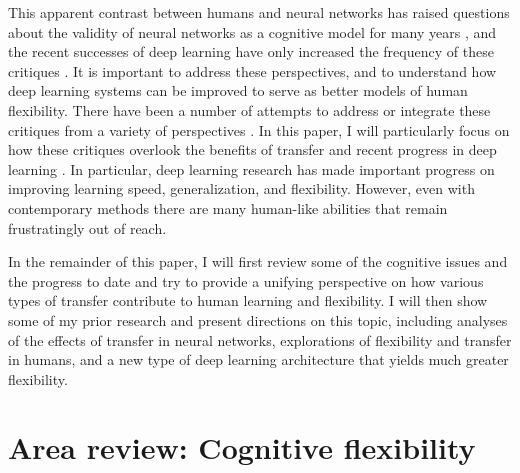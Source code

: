 \documentclass[11pt]{article}
\begin{document}
This apparent contrast between humans and neural networks has raised questions about the validity of neural networks as a cognitive model for many years \citep[e.g.]{Fodor1988}, and the recent successes of deep learning have only increased the frequency of these critiques \citep[e.g.]{Lake2015, Lake2016, Lake2017, Marcus2018}. It is important to address these perspectives, and to understand how deep learning systems can be improved to serve as better models of human flexibility. There have been a number of attempts to address or integrate these critiques from a variety of perspectives \citep[e.g.]{McClelland1999, McClelland2010}. In this paper, I will particularly focus on how these critiques overlook the benefits of transfer \citep{Lampinen2017a} and recent progress in deep learning \citep{Hansen2017}. In particular, deep learning research has made important progress on improving learning speed, generalization, and flexibility. However, even with contemporary methods there are many human-like abilities that remain frustratingly out of reach. \par
In the remainder of this paper, I will first review some of the cognitive issues and the progress to date and try to provide a unifying perspective on how various types of transfer contribute to human learning and flexibility. I will then show some of my prior research and present directions on this topic, including analyses of the effects of transfer in neural networks, explorations of flexibility and transfer in humans, and a new type of deep learning architecture that yields much greater flexibility. \par

\section{Area review: Cognitive flexibility}
\end{document}

